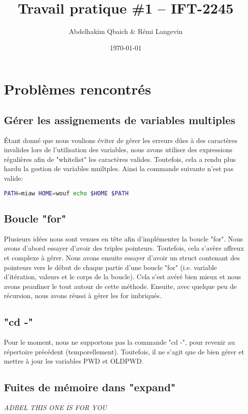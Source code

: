 \documentclass[a4paper]{article}
\title{Travail pratique \#1 -- IFT-2245}
\author{Abdelhakim Qbaich & Rémi Langevin}
\date{\today}
\begin{document}
\maketitle

\section*{Probl\`emes rencontr\'es}
    \subsection*{G\'erer les assignements de variables multiples}
        \'Etant donn\'e que nous voulions \'eviter de g\'erer les erreurs d\^ues \`a des caract\`eres invalides
        lors de l'utilisation des variables, nous avons utiliser des expressions r\'eguli\`eres afin de 
        "whitelist" les caract\`eres valides. Toutefois, cela a rendu plus hardu la gestion de variables 
        muiltples. Ainsi la commande suivante n'est pas valide:
        \begin{lstlisting}[language=bash]
PATH=miaw HOME=wouf echo $HOME $PATH
        \end{lstlisting}
    \subsection*{Boucle "for"}
        Plusieurs id\'ees nous sont venues en t\^ete afin d'impl\'ementer la boucle "for". Nous avons d'abord
        essayer d'avoir des triples pointeurs. Toutefois, cela s'av\`ere affreux et complexe \`a g\'erer.
        Nous avons ensuite essayer d'avoir un struct contenant des pointeurs vers le d\'ebut de chaque partie
        d'une boucle "for" (i.e. variable d'it\'eration, valeurs et le corps de la boucle). Cela s'est av\'er\'e
        bien mieux et nous avons peaufiner le tout autour de cette m\'ethode. Ensuite, avec quelque peu de
        r\'ecursion, nous avons r\'eussi \`a g\'erer les for imbriqu\'es.
    \subsection*{"cd -"}
        Pour le moment, nous ne supportons pas la commande "cd -", pour revenir au r\'epertoire pr\'ec\'edent
        (temporellement). Toutefois, il ne s'agit que de bien g\'erer et mettre \`a jour les variables PWD et 
        OLDPWD.
    \subsection*{Fuites de m\'emoire dans "expand"}
    {\it ADBEL THIS ONE IS FOR YOU}
\end{document}
